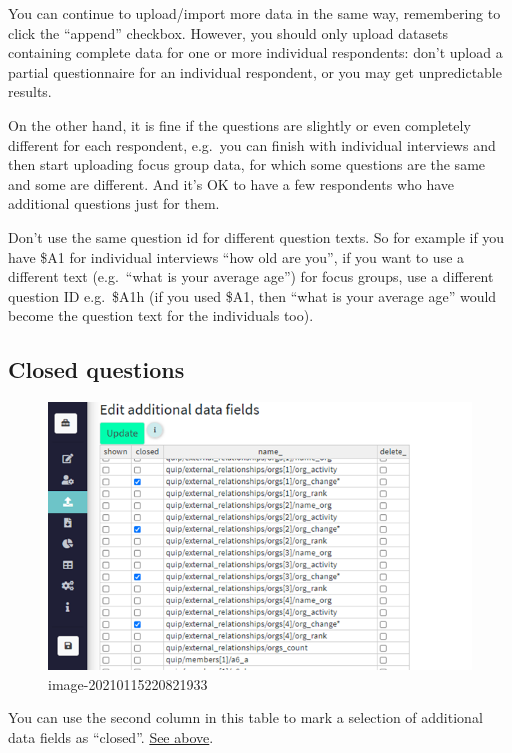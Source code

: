 \documentclass[
]{book}
\begin{document}
You can continue to upload/import more data in the same way, remembering to click the ``append'' checkbox. However, you should only upload datasets containing complete data for one or more individual respondents: don't upload a partial questionnaire for an individual respondent, or you may get unpredictable results.

On the other hand, it is fine if the questions are slightly or even completely different for each respondent, e.g.~you can finish with individual interviews and then start uploading focus group data, for which some questions are the same and some are different. And it's OK to have a few respondents who have additional questions just for them.

Don't use the same question id for different question texts. So for example if you have \$A1 for individual interviews ``how old are you'', if you want to use a different text (e.g.~``what is your average age'') for focus groups, use a different question ID e.g.~\$A1h (if you used \$A1, then ``what is your average age'' would become the question text for the individuals too).

\hypertarget{closed-questions-1}{%
\subsection{Closed questions}\label{closed-questions-1}}

\begin{figure}
\centering
\includegraphics{_assets/image-20210115220821933.png}
\caption{image-20210115220821933}
\end{figure}

You can use the second column in this table to mark a selection of additional data fields as ``closed''. \protect\hyperlink{closed-questions}{See above}.
\end{document}
